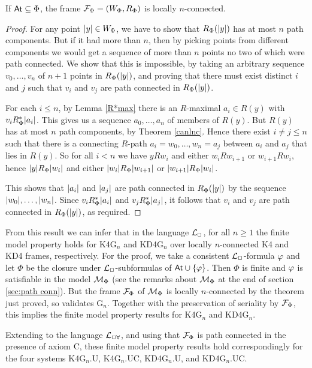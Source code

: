 \begin{theorem} \label{FPhilnc}
If\/ $\mathsf{At}\subseteq\Phi$, the frame $\mathcal{F}_\Phi=(W_\Phi,R_\Phi)$ is locally $n$-connected.
\end{theorem}
\begin{proof}
For any point $|y|\in W_\Phi$, we have to show that $R_\Phi(|y|)$ has at most $n$ path components. But if it had more than $n$, then by picking  points from different components we would get a sequence of more than $n$ points no two of which were path connected. We show that this is impossible, by taking an arbitrary sequence $v_0,\dots,v_n$ of $n+1$ points in $R_\Phi(|y|)$, and proving that there must exist distinct $i$ and $j$ such that $v_i$ and $v_j$ are path connected  in $R_\Phi(|y|)$.

For each $i\leq n$, by Lemma \ref{R*max} there is an $R$-maximal $a_i\in R(y)$ with $v_iR_\Phi^*|a_i|$. This gives us a sequence $a_0,\dots,a_n$   of  members of $R(y)$. But $R(y)$ has at most $n$ path components, by Theorem \ref{canlnc}. Hence there exist $i\ne j\leq n$ such that there is a connecting  $R$-path 
$a_i=w_0,\dots,w_n=a_{j}$ between $a_i$ and $a_{j}$ that lies in $R(y)$. So for all $i<n$ we have $yRw_i$ and either $w_iRw_{i+1}$ or $w_{i+1}Rw_i$, hence $|y|R_\Phi |w_i|$ and either $|w_i|R_\Phi|w_{i+1}|$ or $|w_{i+1}|R_\Phi|w_i|$.

This shows that $|a_i|$ and $|a_j| $ are path connected in $R_\Phi(|y|)$ by the sequence
$|w_0|,\dots,|w_n|$. Since $v_iR_\Phi^*|a_i|$ and $v_jR_\Phi^*|a_j|$, it follows that 
$v_i$ and $v_j $ are path connected in $R_\Phi(|y|)$, as required.
\end{proof}


From this result we can infer that in the language ${\cal L}_\Box$, for all $n\geq 1$ the finite model property holds  for K4G$_n$ and  KD4G$_n$  over locally $n$-connected K4 and KD4  frames, respectively.
For the proof, 
we take a consistent ${\cal L}_\Box$-formula $\varphi$ and let $\Phi$  be the closure under ${\cal L}_\Box$-subformulas of $\mathsf{At}\cup\{\varphi\}$. Then $\Phi$ is finite and $\varphi$ is satisfiable in the model $\mathcal{M}_\Phi$  (see the remarks about $\mathcal{M}_\Phi$ at the end of section \ref{sec:path conn}). But the frame $\mathcal{F}_\Phi$ of $\mathcal{M}_\Phi$ is locally $n$-connected by the theorem just proved, so validates G$_n$.
Together with the preservation of seriality by $\mathcal{F}_\Phi$, this implies the finite model property results for K4G$_n$ and  KD4G$_n$.


Extending to the language ${\cal L}_{\Box\forall}$, and using that $\mathcal{F}_\Phi$ is path connected in the presence of  axiom C, these 
  finite model property results hold  correspondingly for the four systems K4G$_n$.U,  K4G$_n$.UC,  KD4G$_n$.U,  and KD4G$_n$.UC.


